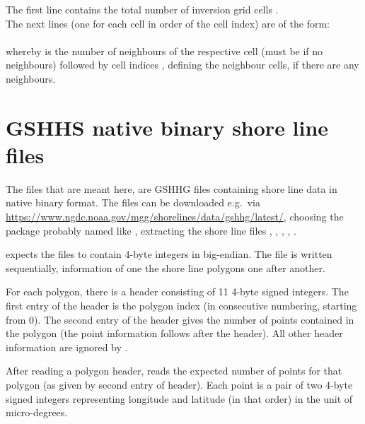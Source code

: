 The first line contains the total number of inversion grid cells .\\
The next  lines (one for each cell in order of the cell index) are of the form:\\
\\
whereby  is the number of neighbours of the respective cell (must be  if 
no neighbours) followed by  cell indices , defining 
the neighbour cells, if there are any neighbours.
%
\section{GSHHS native binary shore line files} \label{files,sec:GSHHS_bin}
%
The files that are meant here, are GSHHG files containing shore line data in native binary format.
The files can be downloaded e.g.\ via 
\url{https://www.ngdc.noaa.gov/mgg/shorelines/data/gshhg/latest/}, choosing the package probably named 
like , extracting the shore line files
, , , , .

\ASKI{} expects the files to contain 4-byte integers in big-endian. The file is written sequentially, 
information of one the shore line polygons one after another. 

For each polygon, there is a header consisting of 11 4-byte signed integers. The first entry of the header
is the polygon index (in consecutive numbering, starting from 0). The second entry of the header gives
the number of points contained in the polygon (the point information follows after the header). 
All other header information are ignored by \ASKI{}.

After reading a polygon header, \ASKI{} reads the expected number of points for that polygon (as given by second
entry of header). Each point is a pair of two 4-byte signed integers representing longitude and latitude 
(in that order) in the unit of micro-degrees.

